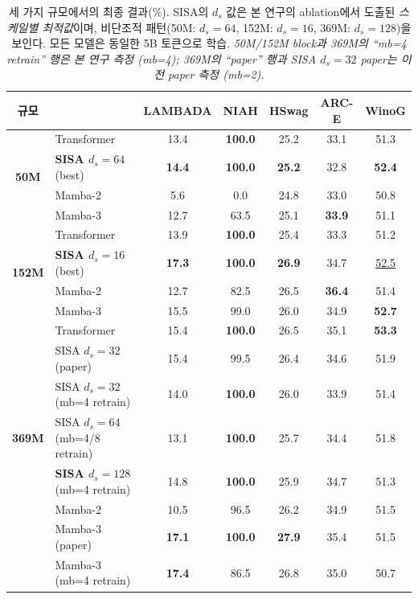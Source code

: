 \documentclass[11pt]{article}
\begin{document}
\begin{table}[h]
\centering\small
\caption{세 가지 규모에서의 최종 결과(\%). SISA의 $d_s$ 값은 본 연구의 ablation에서 도출된 \textit{스케일별 최적값}이며, 비단조적 패턴(50M: $d_s=64$, 152M: $d_s=16$, 369M: $d_s=128$)을 보인다. 모든 모델은 동일한 5B 토큰으로 학습. \textit{50M/152M block과 369M의 ``mb=4 retrain'' 행은 본 연구 측정 (mb=4); 369M의 ``paper'' 행과 SISA $d_s=32$ paper는 이전 paper 측정 (mb=2).}}
\label{tab:scaling}
\begin{tabular}{clccccc}
\toprule
\textbf{규모} & & \textbf{LAMBADA} & \textbf{NIAH} & \textbf{HSwag} & \textbf{ARC-E} & \textbf{WinoG} \\
\midrule
\multirow{4}{*}{\textbf{50M}} & Transformer & 13.4 & \textbf{100.0} & 25.2 & 33.1 & 51.3 \\
& \textbf{SISA $d_s = 64$} (best) & \textbf{14.4} & \textbf{100.0} & \textbf{25.2} & 32.8 & \textbf{52.4} \\
& Mamba-2 & 5.6 & 0.0 & 24.8 & 33.0 & 50.8 \\
& Mamba-3 & 12.7 & 63.5 & 25.1 & \textbf{33.9} & 51.1 \\
\midrule
\multirow{4}{*}{\textbf{152M}} & Transformer & 13.9 & \textbf{100.0} & 25.4 & 33.3 & 51.2 \\
& \textbf{SISA $d_s = 16$} (best) & \textbf{17.3} & \textbf{100.0} & \textbf{26.9} & 34.7 & \underline{52.5} \\
& Mamba-2 & 12.7 & 82.5 & 26.5 & \textbf{36.4} & 51.4 \\
& Mamba-3 & 15.5 & 99.0 & 26.0 & 34.9 & \textbf{52.7} \\
\midrule
\multirow{7}{*}{\textbf{369M}} & Transformer & 15.4 & \textbf{100.0} & 26.5 & 35.1 & \textbf{53.3} \\
& SISA $d_s = 32$ (paper) & 15.4 & 99.5 & 26.4 & 34.6 & 51.9 \\
& SISA $d_s = 32$ (mb=4 retrain) & 14.0 & \textbf{100.0} & 26.0 & 33.9 & 51.4 \\
& SISA $d_s = 64$ (mb=4/8 retrain) & 13.1 & \textbf{100.0} & 25.7 & 34.4 & 51.8 \\
& \textbf{SISA $d_s = 128$} (mb=4 retrain) & 14.8 & \textbf{100.0} & 25.9 & 34.7 & 51.3 \\
& Mamba-2 & 10.5 & 96.5 & 26.2 & 34.9 & 51.5 \\
& Mamba-3 (paper) & \textbf{17.1} & \textbf{100.0} & \textbf{27.9} & 35.4 & 51.5 \\
& Mamba-3 (mb=4 retrain) & \textbf{17.4} & 86.5 & 26.8 & 35.0 & 50.7 \\
\bottomrule
\end{tabular}
\end{table}
\end{document}
